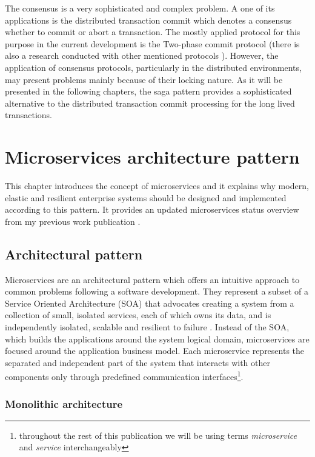 \documentclass[oneside,
  digital, %
  table,   %
  lof,     %
  lot,     %
]{fithesis3}
\begin{document}
The consensus is a very sophisticated and complex problem. A one of its applications is the distributed transaction commit which denotes a consensus whether to commit or abort a transaction. The mostly applied protocol for this purpose in the current development is the Two-phase commit protocol (there is also a research conducted with other mentioned protocols \cite{paxosTransCommit}). However, the application of consensus protocols, particularly in the distributed environments, may present problems mainly because of their locking nature. As it will be presented in the following chapters, the saga pattern \cite{sagas_publ} provides a sophisticated alternative to the distributed transaction commit processing for the long lived transactions.



\clearpage
\chapter{Microservices architecture pattern}

This chapter introduces the concept of microservices and it explains why modern, elastic and resilient enterprise systems should be designed and implemented according to this pattern. It provides an updated microservices status overview from my previous work publication \cite{bachelor_thesis}.

\section{Architectural pattern}

Microservices are an architectural pattern which offers an intuitive approach to common problems following a software development. They represent a subset of a Service Oriented Architecture (SOA) \cite{soa} that advocates creating a system from a collection of small, isolated services, each of which owns its data, and is independently isolated, scalable and resilient to failure \cite{reactive_ms_arch}. Instead of the SOA, which builds the applications around the system logical domain, microservices are focused around the application business model. Each microservice represents the separated and independent part of the system that interacts with other components only through predefined communication interfaces\footnote{throughout the rest of this publication we will be using terms \textit{microservice} and \textit{service} interchangeably}.

\subsection{Monolithic architecture}
\end{document}
